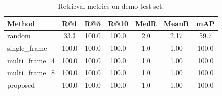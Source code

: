 \begin{table}[h!]
\centering
\caption{Retrieval metrics on demo test set.}
\label{tab:results}
\begin{tabular}{l c c c c c c}
\toprule
Method & R@1 & R@5 & R@10 & MedR & MeanR & mAP \\
\midrule
random & 33.3 & 100.0 & 100.0 & 2.0 & 2.17 & 59.7 \\
single_frame & 100.0 & 100.0 & 100.0 & 1.0 & 1.00 & 100.0 \\
multi_frame_4 & 100.0 & 100.0 & 100.0 & 1.0 & 1.00 & 100.0 \\
multi_frame_8 & 100.0 & 100.0 & 100.0 & 1.0 & 1.00 & 100.0 \\
proposed & 100.0 & 100.0 & 100.0 & 1.0 & 1.00 & 100.0 \\
\bottomrule
\end{tabular}
\end{table}